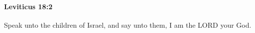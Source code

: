 
		\paragraph{Leviticus 18:2} %
			\label{LEVITICUS-18-2}

			Speak unto the children of Israel, and say unto them, I am the LORD your God.


